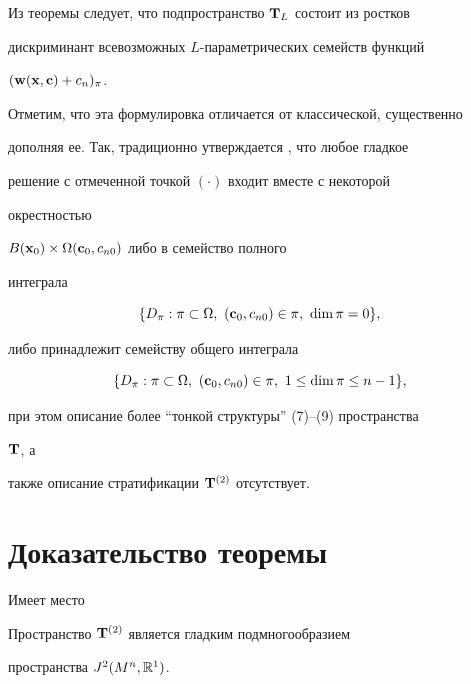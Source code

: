 Из теоремы следует, что подпространство $\bold T_L$ состоит из ростков


дискриминант всевозможных $L$-параметрических семейств функций


$(\bold w(\bold x,\bold c)+c_n)_\pi$.


Отметим, что эта формулировка отличается от классической, существенно


дополняя ее. Так, традиционно утверждается \cite{I5}, что любое гладкое


решение с отмеченной точкой $(\cdot)$ входит вместе с некоторой


окрестностью


$B(\bold x_0)\times\Omega(\bold c_0,c_{n0})$ либо в семейство полного


интеграла


$$


\{D_\pi:\pi\subset\Omega, \ (\bold c_0,c_{n0})\in\pi, \


\dim\pi=0\},


$$


либо принадлежит семейству общего интеграла


$$


\{D_\pi:\pi\subset\Omega, \ (\bold c_0,c_{n0})\in\pi, \


1\le \dim\pi\le n-1\},


$$


при этом описание более ``тонкой структуры'' (7)--(9) пространства


$\bold T$, а


также описание стратификации $\bold T^{(2)}$ отсутствует.





\section{Доказательство теоремы}





Имеет место





\begin{lem}


Пространство $\bold T^{(2)}$ является гладким подмногообразием


пространства $J^2(M^n,\Bbb R^1)$.


\end{lem}





